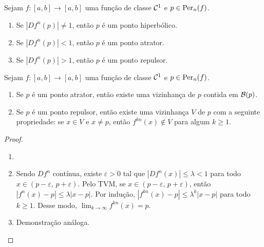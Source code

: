 \begin{definition}
Sejam $f: [a, b] \to [a, b]$ uma função de classe $\mathcal{C}^1$ e $p \in \operatorname{Per}_n(f)$.
\begin{enumerate}[label=\alph*.]
\item Se $|D f^n(p)| \neq 1$, então $p$ é um ponto hiperbólico.
\item Se $|D f^n(p)| < 1$, então $p$ é um ponto atrator.
\item Se $|D f^n(p)| > 1$, então $p$ é um ponto repulsor.
\end{enumerate}
\end{definition}

\begin{theorem}
Sejam $f: [a, b] \to [a, b]$ uma função de classe $\mathcal{C}^1$ e $p \in \operatorname{Per}_n(f)$.
\begin{enumerate}
\item Se $p$ é um ponto atrator, então existe uma vizinhança de $p$ contida em $\mathcal{B}(p)$.
\item Se $p$ é um ponto repulsor, então existe uma vizinhança $V$ de $p$ com a seguinte propriedade: se $x \in V$ e $x \neq p$, então  $f^{kn}(x) \notin V$ para algum $k \geq 1$. 
\end{enumerate}
\end{theorem}

\begin{proof}
\begin{enumerate}\item[]
\item Sendo $D f^n$ contínua, existe $\varepsilon > 0$ tal que $|D f^n(x)| \leq \lambda < 1$ para todo $x \in (p - \varepsilon,\, p + \varepsilon)$. Pelo TVM, se $x \in (p - \varepsilon,\, p + \varepsilon)$, então $|f^n(x) - p| \leq \lambda|x - p|$. Por indução, $|f^{kn}(x) - p| \leq \lambda^k|x - p|$ para todo $k \geq 1$. Desse modo, $\lim_{k \to \infty} f^{kn}(x) = p$.
\item Demonstração análoga.
\end{enumerate}
\end{proof}
